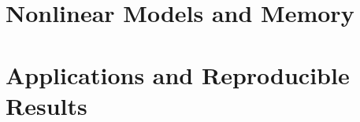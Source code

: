 \documentclass[11pt,letterpaper,oneside]{book}
\begin{document}
\part{Nonlinear Models and Memory}


\part{Applications and Reproducible Results}




\appendix




\backmatter


\end{document}

